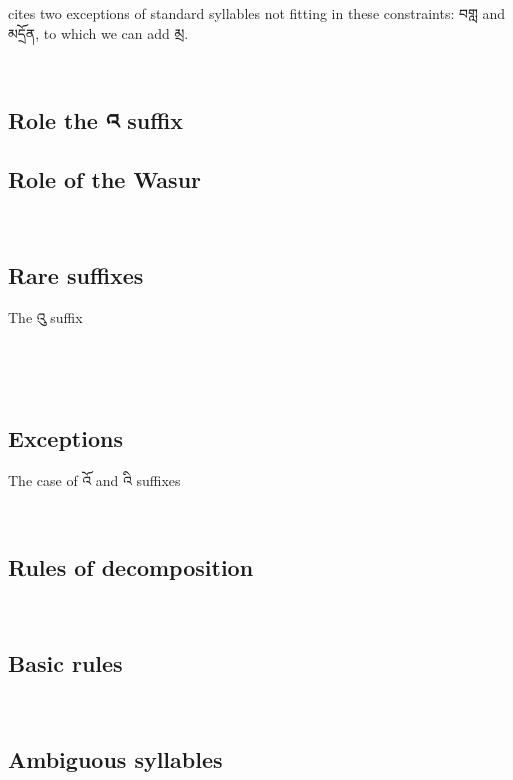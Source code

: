 \documentclass[%
a4paper,%
pagesize,%
12pt,%
parskip=off,%
bibliography=totoc,%
numbers=noenddot,%
DIV=12,%
twoside=semi,%
headings=normal%
]{scrartcl}
\begin{document}
\cite{TsheshabGrammarTopics} cites two exceptions of standard syllables not fitting in these constraints: བགླ and མདྲོན, to which we can add མྲ.

­\subsection{Role the འ suffix}

\subsection{Role of the Wasur}

­\subsection{Rare suffixes}
The འུ suffix

­ 

­\subsection{Exceptions}

The case of འོ and འི suffixes

­\subsection{Rules of decomposition}

­\subsection{Basic rules}

­\subsection{Ambiguous syllables}

­



\end{document}
